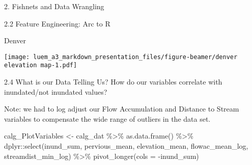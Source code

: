 \documentclass[
  ignorenonframetext,
]{beamer}
\newenvironment{Shaded}{\begin{snugshade}}{\end{snugshade}}
\newcommand{\AttributeTok}[1]{\textcolor[rgb]{0.77,0.63,0.00}{#1}}
\newcommand{\ConstantTok}[1]{\textcolor[rgb]{0.00,0.00,0.00}{#1}}
\newcommand{\DecValTok}[1]{\textcolor[rgb]{0.00,0.00,0.81}{#1}}
\newcommand{\FloatTok}[1]{\textcolor[rgb]{0.00,0.00,0.81}{#1}}
\newcommand{\FunctionTok}[1]{\textcolor[rgb]{0.00,0.00,0.00}{#1}}
\newcommand{\NormalTok}[1]{#1}
\newcommand{\OtherTok}[1]{\textcolor[rgb]{0.56,0.35,0.01}{#1}}
\newcommand{\SpecialCharTok}[1]{\textcolor[rgb]{0.00,0.00,0.00}{#1}}
\newcommand{\StringTok}[1]{\textcolor[rgb]{0.31,0.60,0.02}{#1}}
\begin{document}
\begin{frame}[fragile]{2. Fishnets and Data Wrangling}
\begin{block}{2.2 Feature Engineering: Arc to R}
\begin{block}{Denver}
\begin{Shaded}
\end{Shaded}

\texttt{[image: luem\_a3\_markdown\_presentation\_files/figure-beamer/denver elevation map-1.pdf]}
\end{block}
\end{block}

\begin{block}{2.4 What is our Data Telling Us?}
\protect\hypertarget{what-is-our-data-telling-us}{}
How do our variables correlate with inundated/not inundated values?

Note: we had to log adjust our Flow Accumulation and Distance to Stream
variables to compensate the wide range of outliers in the data set.

\begin{Shaded}
\begin{Highlighting}[]
\NormalTok{calg\_PlotVariables }\OtherTok{\textless{}{-}}\NormalTok{ calg\_dat }\SpecialCharTok{\%\textgreater{}\%} 
  \FunctionTok{as.data.frame}\NormalTok{() }\SpecialCharTok{\%\textgreater{}\%}
\NormalTok{    dplyr}\SpecialCharTok{::}\FunctionTok{select}\NormalTok{(inund\_sum, pervious\_mean, elevation\_mean, flowac\_mean\_log, streamdist\_min\_log) }\SpecialCharTok{\%\textgreater{}\%} 
    \FunctionTok{pivot\_longer}\NormalTok{(}\AttributeTok{cols =} \SpecialCharTok{{-}}\NormalTok{inund\_sum)}
\end{Highlighting}
\end{Shaded}


\end{block}
\end{frame}
\end{document}

